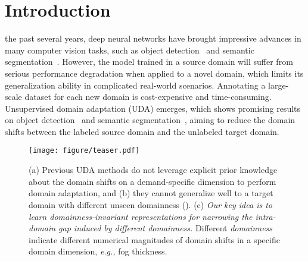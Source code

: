 \documentclass[10pt,journal,compsoc]{IEEEtran}
\begin{document}
\section{Introduction}\label{sec:introduction}
 the past several years, deep neural networks have brought impressive advances in many computer vision tasks, such as object detection~\cite{girshick2014rich,ren2016faster,chen2017s,focal_loss,shen2019object,cai2019cascade,oksuz2020imbalance,Tan_2022_TPAMI_mirror,zhou222transvod} and semantic segmentation~\cite{fcn, chen2017deeplab,chen2018encoder,zhao2017pspnet,feng2020dmt,lin2017exploring,badrinarayanan2017segnet,night_city}. 
However, the model trained in a source domain will suffer from serious performance degradation when applied to a novel domain, which limits its generalization ability in complicated real-world scenarios. Annotating a large-scale dataset for each new domain is cost-expensive and time-consuming. 
Unsupervised domain adaptation (UDA) emerges, which shows promising results on object detection~\cite{DA-Faster-RCNN,SWDA,MAF,SCDA,GPA,HTCN,ICR-CCR,SCL,hsu2020every,ATF,sindagi2019prior,zhao2020collaborative,ART-PCA,PIT} and semantic segmentation~\cite{ASA,CLANv2,CyCADA, AdaptSegNet,BDL,LTIR,CLAN,SIM, DISE,FDA,STAR,PCEDA,IntraDA,APODA,FADA,DADA,choi2019self,SIBAN,CRST,CBST,Conservative_loss,AdaptPatch,guo2021label},
aiming to reduce the domain shifts between the labeled source domain and the unlabeled target domain. 



\begin{figure}[!t] 
\centering
\texttt{[image: figure/teaser.pdf]}
\caption{
(a) Previous UDA methods do not leverage explicit prior knowledge about the domain shifts on a demand-specific dimension to perform domain adaptation, and (b) they cannot generalize well to a target domain with different unseen domainness (). (c) \textit{Our key idea is to learn  domainness-invariant representations for narrowing the intra-domain gap induced by different domainness.} Different \textit{domainness} indicate different numerical magnitudes of domain shifts in a specific domain dimension, \emph{e.g.,} fog thickness. 
}
\label{teaser}
\end{figure}
\end{document}
